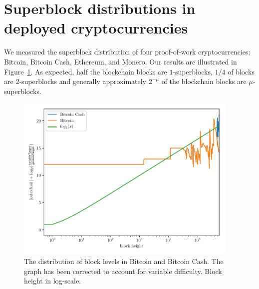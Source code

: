 \section{Superblock distributions in deployed cryptocurrencies}

We measured the superblock distribution of four proof-of-work cryptocurrencies:
Bitcoin, Bitcoin Cash, Ethereum, and Monero. Our results are illustrated in
Figure~\ref{fig.btc-bch-superblocks}. As expected, half the blockchain blocks are
$1$-superblocks, $1/4$ of blocks are $2$-superblocks and generally approximately
$2^{-\mu}$ of the blockchain blocks are $\mu$-superblocks.

\begin{figure}[h]
\begin{center}
  \includegraphics[width=0.95\textwidth]{figures/bitcoin-superblock-distribution.pdf}
  \caption{The distribution of block levels in Bitcoin and Bitcoin Cash. The
           graph has been corrected to account for variable difficulty. Block
           height in log-scale.}
  \label{fig.btc-bch-superblocks}
  \end{center}
\end{figure}

